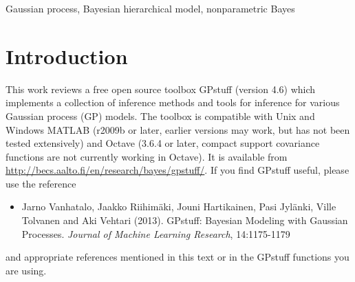 \documentclass[twoside,11pt]{article}
\newcommand{\pkg}[1]{{\fontseries{b}\selectfont #1}}
\newcommand{\proglang}{}
\begin{document}
\begin{abstract}%
  Gaussian processes (GP) are powerful tools for probabilistic
  modeling purposes. They can be used to define prior distributions 
  over latent functions in hierarchical Bayesian models. The prior
  over functions is defined implicitly by the mean and covariance
  function, which determine the smoothness and variability of the
  function. The inference can then be conducted directly in the
  function space by evaluating or approximating the posterior process.
  Despite their attractive theoretical properties GPs provide
  practical challenges in their implementation. \pkg{GPstuff} is a
  versatile collection of computational tools for GP models compatible
  with Linux and Windows \proglang{MATLAB} and Octave.  It includes,
  among others, various inference methods, sparse approximations and
  tools for model assessment. In this work, we review these tools and
  demonstrate the use of \pkg{GPstuff} in several models.\\ Last updated 2015-07-15.
\end{abstract}

\begin{keywords}
Gaussian process, Bayesian hierarchical model, nonparametric Bayes
\end{keywords}

% 

\newpage

\tableofcontents

\section{Introduction}

This work reviews a free open source toolbox \pkg{GPstuff} (version
4.6) which implements a collection of inference methods and tools for
inference for various Gaussian process (GP) models. The toolbox is
compatible with Unix and Windows \proglang{MATLAB} \citep{MATLAB:2010}
(r2009b or later, earlier versions may work, but has not been tested
extensively) and \proglang{Octave} \citep{octave:2012} (3.6.4 or
later, compact support covariance functions are not currently working
in Octave). It is available from
\url{http://becs.aalto.fi/en/research/bayes/gpstuff/}.
If you find GPstuff useful, please use the reference \citep{Vanhatalo+gpstuff:2013}
\begin{itemize}
\item[] Jarno Vanhatalo, Jaakko Riihim{\"a}ki, Jouni Hartikainen, Pasi
  Jyl{\"a}nki, Ville Tolvanen and Aki Vehtari (2013). GPstuff: Bayesian
  Modeling with Gaussian Processes. \emph{Journal of Machine Learning
    Research}, 14:1175-1179
\end{itemize}
and appropriate references mentioned in this text or in the GPstuff
functions you are using.
\end{document}
